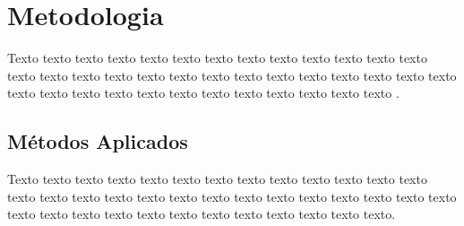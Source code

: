 \chapter{Metodologia}
\label{cap:metodologia}

Texto texto texto texto texto texto texto texto texto texto texto texto texto texto texto texto texto texto texto texto texto texto texto texto texto texto texto texto texto texto texto texto texto texto texto texto texto texto texto \cite{ref:Nuseibeh}.

\section{Métodos Aplicados}
\label{sec:metodos-aplicados}

Texto texto texto texto texto texto texto texto texto texto texto texto texto texto texto texto texto texto texto texto texto texto texto texto texto texto texto texto texto texto texto texto texto texto texto texto texto texto texto.
